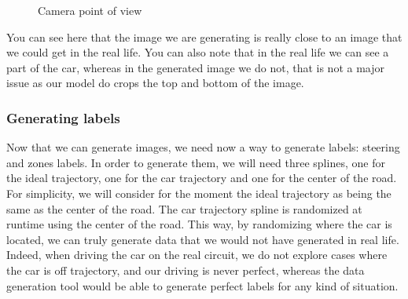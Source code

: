\documentclass[12pt]{article}
\begin{document}
\begin{figure}[h]
    \centering
    \hfill %
    \caption{Camera point of view}
\end{figure}
You can see here that the image we are generating is really close to an image that we could get in the real life. You can also note that in the real life we can see a part of the car, whereas in the generated image we do not, that is not a major issue as our model do crops the top and bottom of the image. 

\subsubsection{Generating labels}
Now that we can generate images, we need now a way to generate labels: steering and zones labels. In order to generate them, we will need three splines, one for the ideal trajectory, one for the car trajectory and one for the center of the road. For simplicity, we will consider for the moment the ideal trajectory as being the same as the center of the road. The car trajectory spline is randomized at runtime using the center of the road. This way, by randomizing where the car is located, we can truly generate data that we would not have generated in real life. Indeed, when driving the car on the real circuit, we do not explore cases where the car is off trajectory, and our driving is never perfect, whereas the data generation tool would be able to generate perfect labels for any kind of situation.
\end{document}
